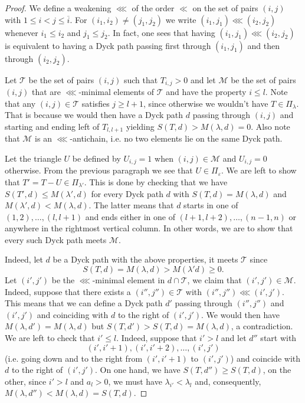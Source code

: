 \documentclass[ALCO,ThmDefs,Unicode]{cedram}
\newcommand{\la}{\lambda}
\begin{document}
\begin{proof}
We define a weakening $\lll$ of the order $\ll$ on the set of pairs $(i,j)$ with $1\le i<j\le\overline i$. For $(i_1,i_2)\neq(j_1,j_2)$ we write $(i_1,j_1)\lll(i_2,j_2)$ whenever $i_1\le i_2$ and $j_1\le j_2$. In fact, one sees that having $(i_1,j_1)\lll(i_2,j_2)$ is equivalent to having a Dyck path passing first through $(i_1,j_1)$ and then through $(i_2,j_2)$.

Let $\mathcal T$ be the set of pairs $(i,j)$ such that $T_{i,j}>0$ and let $\mathcal M$ be the set of pairs $(i,j)$ that are $\lll$-minimal elements of $\mathcal T$ and have the property $i\le l$. Note that any $(i,j)\in\mathcal T$ satisfies $j\ge l+1$, since otherwise we wouldn't have $T\in\Pi_\lambda$. That is because we would then have a Dyck path $d$ passing through $(i,j)$ and starting and ending left of $T_{l,l+1}$ yielding $S(T,d)>M(\la,d)=0$. Also note that $\mathcal M$ is an $\lll$-antichain, i.e. no two elements lie on the same Dyck path.

Let the triangle $U$ be defined by $U_{i,j}=1$ when $(i,j)\in\mathcal M$ and $U_{i,j}=0$ otherwise. From the previous paragraph we see that $U\in\Pi_\varepsilon$. We are left to show that $T'=T-U\in\Pi_{\lambda'}$. This is done by checking that we have $S(T',d)\le M(\la',d)$ for every Dyck path $d$ with $S(T,d)=M(\la,d)$ and $M(\la',d)<M(\la,d)$. The latter means that $d$ starts in one of $(1,2),\dots,(l,l+1)$ and ends either in one of $(l+1,l+2),\dots,(n-1,n)$ or anywhere in the rightmost vertical column. In other words, we are to show that every such Dyck path meets $\mathcal M$.

Indeed, let $d$ be a Dyck path with the above properties, it meets $\mathcal T$ since
\[
S(T,d)=M(\la,d)>M(\la'd)\ge 0.
\]
Let $(i',j')$ be the $\lll$-minimal element in $d\cap\mathcal T$, we claim that $(i',j')\in\mathcal M$. Indeed, suppose that there exists a $(i'',j'')\in\mathcal T$ with $(i'',j'')\lll(i',j')$. This means that we can define a Dyck path $d'$ passing through $(i'',j'')$ and $(i',j')$ and coinciding with $d$ to the right of $(i',j')$. We would then have $M(\la,d')=M(\la,d)$ but $S(T,d')>S(T,d)=M(\la,d)$, a contradiction. We are left to check that $i'\le l$. Indeed, suppose that $i'>l$ and let $d''$ start with
\[
(i',i'+1),(i',i'+2),\dots,(i',j')
\]
(i.e. going down and to the right from $(i',i'+1)$ to $(i',j')$) and coincide with $d$ to the right of $(i',j')$. On one hand, we have $S(T,d'')\ge S(T,d)$, on the other, since $i'>l$ and $a_l>0$, we must have $\lambda_{i'}<\la_l$ and, consequently, $M(\la,d'')<M(\la,d)=S(T,d)$.
\end{proof}
\end{document}
